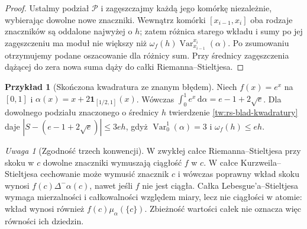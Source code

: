 \documentclass[11pt,a4paper]{article}
\numberwithin{equation}{section}
\theoremstyle{plain}
\theoremstyle{definition}
\newtheorem{przyklad}[twierdzenie]{Przykład}
\theoremstyle{remark}
\newtheorem{uwaga}[twierdzenie]{Uwaga}
\newcommand{\ind}[1]{\mathbf 1_{#1}}
\newcommand{\Var}{\operatorname{Var}}
\begin{document}
\begin{proof}
Ustalmy podział $\mathcal P$ i zagęszczajmy każdą jego komórkę niezależnie, wybierając dowolne nowe znaczniki. Wewnątrz komórki $[x_{i-1},x_i]$ oba rodzaje znaczników są oddalone najwyżej o $h$; zatem różnica starego wkładu i sumy po jej zagęszczeniu ma moduł nie większy niż $\omega_f(h)\Var_{x_{i-1}}^{x_i}(\alpha)$. Po zsumowaniu otrzymujemy podane oszacowanie dla różnicy sum. Przy średnicy zagęszczenia dążącej do zera nowa suma dąży do całki Riemanna--Stieltjesa.
\end{proof}
\begin{przyklad}[Skończona kwadratura ze znanym błędem]
Niech $f(x)=e^x$ na $[0,1]$ i $\alpha(x)=x+2\ind{[1/2,1]}(x)$. Wówczas
$\int_0^1e^x\,\mathrm d\alpha=e-1+2\sqrt e$.
Dla dowolnego podziału znaczonego o średnicy $h$ twierdzenie \ref{tw:rs-blad-kwadratury} daje
$|S-(e-1+2\sqrt e)|\le 3eh$, gdyż $\Var_0^1(\alpha)=3$ i $\omega_f(h)\le eh$.
\end{przyklad}
\begin{uwaga}[Zgodność trzech konwencji]
W zwykłej całce Riemanna--Stieltjesa przy skoku w $c$ dowolne znaczniki wymuszają ciągłość $f$ w $c$. W całce Kurzweila--Stieltjesa cechowanie może wymusić znacznik $c$ i wówczas poprawny wkład skoku wynosi $f(c)\Delta^-\alpha(c)$, nawet jeśli $f$ nie jest ciągła. Całka Lebesgue'a--Stieltjesa wymaga mierzalności i całkowalności względem miary, lecz nie ciągłości w atomie: wkład wynosi również $f(c)\mu_\alpha(\{c\})$. Zbieżność wartości całek nie oznacza więc równości ich dziedzin.
\end{uwaga}
\end{document}

